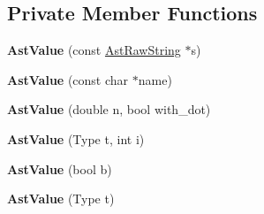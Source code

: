 \subsection*{Private Member Functions}
\begin{DoxyCompactItemize}
\item 
{\bfseries Ast\+Value} (const \hyperlink{classv8_1_1internal_1_1_ast_raw_string}{Ast\+Raw\+String} $\ast$s)\hypertarget{classv8_1_1internal_1_1_ast_value_af1fc1d3c95c118d5f67bb12109e33022}{}\label{classv8_1_1internal_1_1_ast_value_af1fc1d3c95c118d5f67bb12109e33022}

\item 
{\bfseries Ast\+Value} (const char $\ast$name)\hypertarget{classv8_1_1internal_1_1_ast_value_affa290be22b18cbc0f1790446dd2b5b1}{}\label{classv8_1_1internal_1_1_ast_value_affa290be22b18cbc0f1790446dd2b5b1}

\item 
{\bfseries Ast\+Value} (double n, bool with\+\_\+dot)\hypertarget{classv8_1_1internal_1_1_ast_value_a881a481c94fb60b33bd61932cba0b5a5}{}\label{classv8_1_1internal_1_1_ast_value_a881a481c94fb60b33bd61932cba0b5a5}

\item 
{\bfseries Ast\+Value} (Type t, int i)\hypertarget{classv8_1_1internal_1_1_ast_value_aada1e2007bf2ce4d91e6e86f36b1bfe8}{}\label{classv8_1_1internal_1_1_ast_value_aada1e2007bf2ce4d91e6e86f36b1bfe8}

\item 
{\bfseries Ast\+Value} (bool b)\hypertarget{classv8_1_1internal_1_1_ast_value_a49b7eb7fee2897632398a9db98885d1b}{}\label{classv8_1_1internal_1_1_ast_value_a49b7eb7fee2897632398a9db98885d1b}

\item 
{\bfseries Ast\+Value} (Type t)\hypertarget{classv8_1_1internal_1_1_ast_value_ae64267375cdeab6e3fe43be61891f692}{}\label{classv8_1_1internal_1_1_ast_value_ae64267375cdeab6e3fe43be61891f692}

\end{DoxyCompactItemize}
